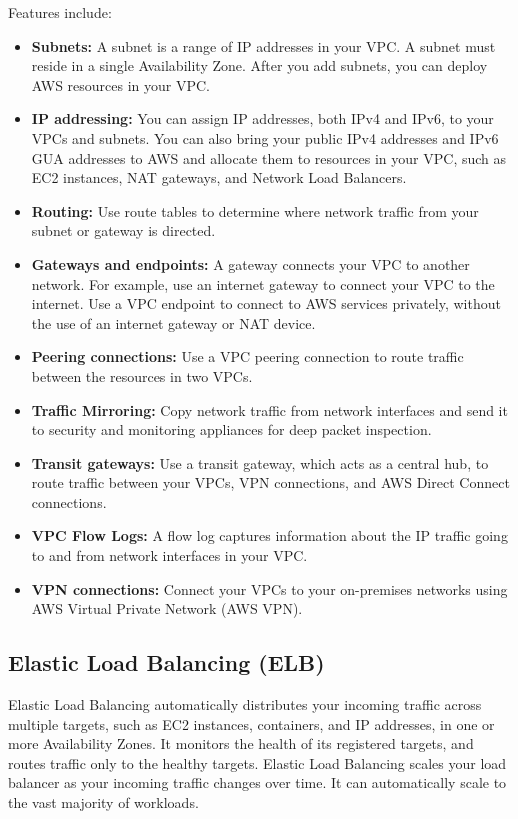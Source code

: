 		Features include:
		\begin{itemize}
			\item \textbf{Subnets:} A subnet is a range of IP addresses in your VPC. A subnet must reside in a single Availability Zone. 
			After you add subnets, you can deploy AWS resources in your VPC.
			\item \textbf{IP addressing:} You can assign IP addresses, both IPv4 and IPv6, to your VPCs and subnets. 
			You can also bring your public IPv4 addresses and IPv6 GUA addresses to AWS and allocate them to resources in your VPC, 
			such as EC2 instances, NAT gateways, and Network Load Balancers.
			\item \textbf{Routing:} Use route tables to determine where network traffic from your subnet or gateway is directed.
			\item \textbf{Gateways and endpoints:} A gateway connects your VPC to another network. For example, use an internet gateway 
			to connect your VPC to the internet. Use a VPC endpoint to connect to AWS services privately, without the use of an 
			internet gateway or NAT device.
			\item \textbf{Peering connections:} Use a VPC peering connection to route traffic between the resources in two VPCs.
			\item \textbf{Traffic Mirroring:} Copy network traffic from network interfaces and send it to security and 
			monitoring appliances for deep packet inspection.
			\item \textbf{Transit gateways:} Use a transit gateway, which acts as a central hub, to route traffic between your VPCs, 
			VPN connections, and AWS Direct Connect connections.
			\item \textbf{VPC Flow Logs:} A flow log captures information about the IP traffic going to and from network interfaces in your VPC.
			\item \textbf{VPN connections:} Connect your VPCs to your on-premises networks using AWS Virtual Private Network (AWS VPN). 
		\end{itemize}

	\subsection{Elastic Load Balancing (ELB)}
		Elastic Load Balancing \cite{elb} automatically distributes your incoming traffic across multiple targets, 
		such as EC2 instances, containers, and IP addresses, in one or more Availability Zones. 
		It monitors the health of its registered targets, and routes traffic only to the healthy targets. 
		Elastic Load Balancing scales your load balancer as your incoming traffic changes over time. 
		It can automatically scale to the vast majority of workloads.

